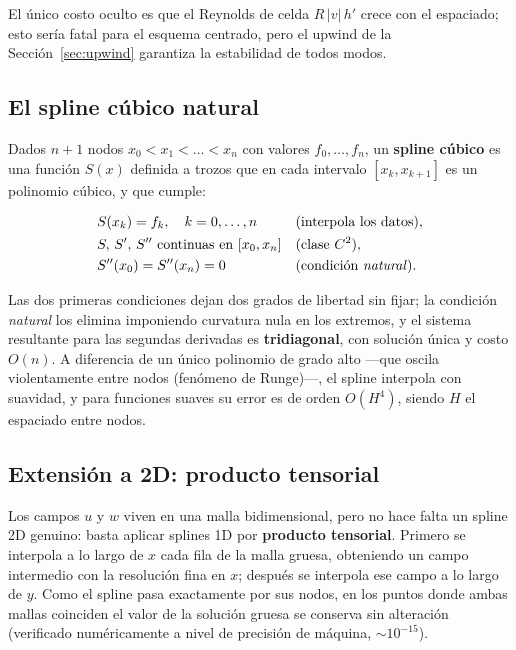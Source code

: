 \documentclass[12pt, a4paper]{article}
\begin{document}
El único costo oculto es que el Reynolds de celda $R\,|v|\,h'$ crece con el
espaciado; esto sería fatal para el esquema centrado, pero el upwind de la
Sección~\ref{sec:upwind} garantiza la estabilidad de todos modos.

\subsection{El spline cúbico natural}

Dados $n+1$ nodos $x_0 < x_1 < \dots < x_n$ con valores $f_0, \dots, f_n$,
un \textbf{spline cúbico} es una función $S(x)$ definida a trozos que en
cada intervalo $[x_k, x_{k+1}]$ es un polinomio cúbico, y que cumple:

\begin{ecbox}
  \begin{align}
    &S(x_k) = f_k, \quad k = 0,\dots,n
      &&\text{(interpola los datos)},\\
    &S,\, S',\, S'' \text{ continuas en } [x_0, x_n]
      &&\text{(clase } C^{2}\text{)},\\
    &S''(x_0) = S''(x_n) = 0
      &&\text{(condición \emph{natural})}.
  \end{align}
\end{ecbox}

Las dos primeras condiciones dejan dos grados de libertad sin fijar; la
condición \emph{natural} los elimina imponiendo curvatura nula en los
extremos, y el sistema resultante para las segundas derivadas es
\textbf{tridiagonal}, con solución única y costo $O(n)$. A diferencia de un
único polinomio de grado alto —que oscila violentamente entre nodos
(fenómeno de Runge)—, el spline interpola con suavidad, y para funciones
suaves su error es de orden $O(H^{4})$, siendo $H$ el espaciado entre nodos.

\subsection{Extensión a 2D: producto tensorial}

Los campos $u$ y $w$ viven en una malla bidimensional, pero no hace falta un
spline 2D genuino: basta aplicar splines 1D por \textbf{producto tensorial}.
Primero se interpola a lo largo de $x$ cada fila de la malla gruesa,
obteniendo un campo intermedio con la resolución fina en $x$; después se
interpola ese campo a lo largo de $y$. Como el spline pasa exactamente por
sus nodos, en los puntos donde ambas mallas coinciden el valor de la
solución gruesa se conserva sin alteración (verificado numéricamente a
nivel de precisión de máquina, $\sim 10^{-15}$).
\end{document}
